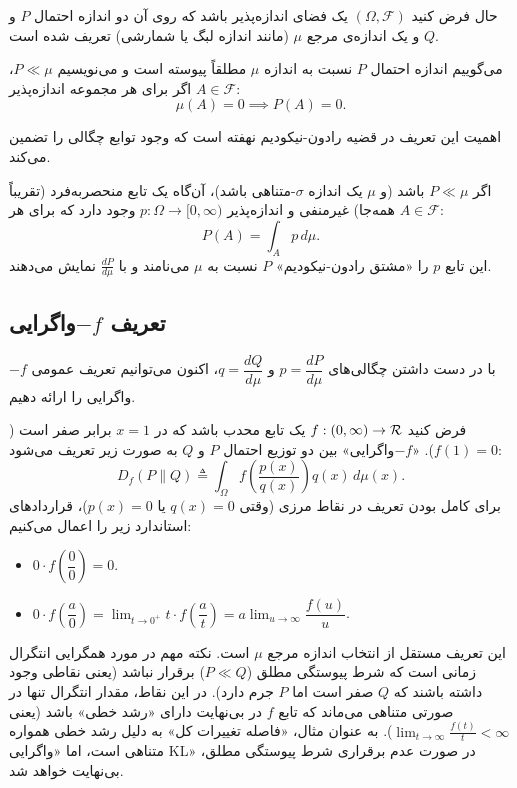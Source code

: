 حال فرض کنید $(\Omega, \mathcal{F})$ یک فضای اندازه‌پذیر باشد که روی آن دو اندازه احتمال $P$ و $Q$ و یک اندازه‌ی مرجع $\mu$ (مانند اندازه لبگ یا شمارشی) تعریف شده است.

\begin{تعریف}
می‌گوییم اندازه احتمال $P$ نسبت به اندازه $\mu$ مطلقاً پیوسته است و می‌نویسیم $P \ll \mu$، اگر برای هر مجموعه اندازه‌پذیر $A \in \mathcal{F}$:
\begin{equation}
\mu(A) = 0 \implies P(A) = 0.
\end{equation}
\end{تعریف}

اهمیت این تعریف در قضیه رادون-نیکودیم نهفته است که وجود توابع چگالی را تضمین می‌کند.

\begin{قضیه}
اگر $P \ll \mu$ باشد (و $\mu$ یک اندازه $\sigma$-متناهی باشد)، آن‌گاه یک تابع منحصر‌به‌فرد (تقریباً همه‌جا) غیرمنفی و اندازه‌پذیر $p: \Omega \to [0, \infty)$ وجود دارد که برای هر $A \in \mathcal{F}$:
\begin{equation}
P(A) = \int_A p \, d\mu.
\end{equation}
این تابع $p$ را «مشتق رادون-نیکودیم» $P$ نسبت به $\mu$ می‌نامند و با $\frac{dP}{d\mu}$ نمایش می‌دهند.
\end{قضیه}

\subsection{تعریف $-f$واگرایی}
\label{sec:bg:f-div-formula}

با در دست داشتن چگالی‌های $p = \dfrac{dP}{d\mu}$ و $q = \dfrac{dQ}{d\mu}$، اکنون می‌توانیم تعریف عمومی $-f$واگرایی را ارائه دهیم.

\begin{تعریف}[$-f$واگرایی]
\label{def:f-divergence}
فرض کنید $f: (0, \infty) \to \Rset$ یک تابع محدب باشد که در $x=1$ برابر صفر است ($f(1)=0$). «$-f$واگرایی» بین دو توزیع احتمال $P$ و $Q$ به صورت زیر تعریف می‌شود:
\begin{equation}
D_f(P \| Q) \triangleq \int_{\Omega} f\left( \frac{p(x)}{q(x)} \right) q(x) \, d\mu(x).
\end{equation}
برای کامل بودن تعریف در نقاط مرزی (وقتی $q(x)=0$ یا $p(x)=0$)، قراردادهای استاندارد زیر را اعمال می‌کنیم:
\begin{itemize}
    \item $0 \cdot f\left(\dfrac{0}{0}\right) = 0$.
    \item $0 \cdot f\left(\dfrac{a}{0}\right) = \lim_{t \to 0^+} t \cdot f(\dfrac{a}{t}) = a \lim_{u \to \infty} \dfrac{f(u)}{u}$.
\end{itemize}
\end{تعریف}
این تعریف مستقل از انتخاب اندازه مرجع $\mu$ است. نکته مهم در مورد همگرایی انتگرال زمانی است که شرط پیوستگی مطلق ($P \ll Q$) برقرار نباشد (یعنی نقاطی وجود داشته باشند که $Q$ صفر است اما $P$ جرم دارد). در این نقاط، مقدار انتگرال تنها در صورتی متناهی می‌ماند که تابع $f$ در بی‌نهایت دارای «رشد خطی» باشد (یعنی $\lim_{t\to\infty} \frac{f(t)}{t} < \infty$). به عنوان مثال، «فاصله تغییرات کل» به دلیل رشد خطی همواره متناهی است، اما «واگرایی KL» در صورت عدم برقراری شرط پیوستگی مطلق، بی‌نهایت خواهد شد.

